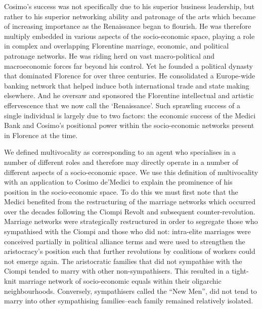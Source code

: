 Cosimo's success was not specifically due to his superior business leadership, but rather to his superior networking ability and patronage of the arts which became of increasing importance as the Renaissance began to flourish. He was therefore multiply embedded in various aspects of the socio-economic space, playing a role in complex and overlapping Florentine marriage, economic, and political patronage networks. He was riding herd on vast macro-political and macroeconomic forces far beyond his control. Yet he founded a political dynasty that dominated Florence for over three centuries. He consolidated a Europe-wide banking network that helped induce both international trade and state making elsewhere. And he oversaw and sponsored the Florentine intellectual and artistic effervescence that we now call the `Renaissance'. Such sprawling success of a single individual is largely due to two factors: the economic success of the Medici Bank and Cosimo's positional power within the socio-economic networks present in Florence at the time.

We defined multivocality as corresponding to an agent who specialises in a number of different roles and therefore may directly operate in a number of different aspects of a socio-economic space. We use this definition of multivocality with an application to Cosimo de'Medici to explain the prominence of his position in the socio-economic space. To do this we must first note that the Medici benefited from the restructuring of the marriage networks which occurred over the decades following the Ciompi Revolt and subsequent counter-revolution. Marriage networks were strategically restructured in order to segregate those who sympathised with the Ciompi and those who did not: intra-elite marriages were conceived partially in political alliance terms and were used to strengthen the aristocracy's position such that further revolutions by coalitions of workers could not emerge again. The aristocratic families that did not sympathise with the Ciompi tended to marry with other non-sympathisers. This resulted in a tight-knit marriage network of socio-economic equals within their oligarchic neighbourhoods. Conversely, sympathisers called the ``New Men'', did not tend to marry into other sympathising families--each family remained relatively isolated.

